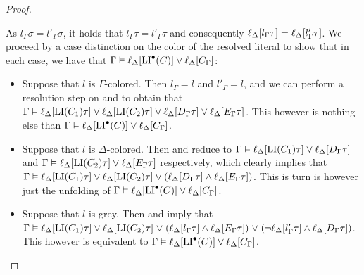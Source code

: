 \documentclass[,%
	draft=false,%
	numbers=noendperiod
	11pt,
	a4paper,
	oneside,%
	openany,
]{memoir}
\begin{document}
\begin{proof}
\begin{description}
			As $l_\Gamma\sigma = l'_\Gamma\sigma$,
			it holds that $l_\Gamma\tau = l'_\Gamma\tau$ and consequently 
			$\ell_{\Delta}[l_\Gamma\tau] = \ell_{\Delta}[l'_\Gamma\tau]$.
			We proceed by a case distinction on the color of the resolved literal to show that in each case, we have that
			$\Gamma \vDash \ell_{\Delta}[\operatorname{LI}^\bullet(C)] \lor \ell_{\Delta}[C_\Gamma]$:
			\begin{itemize}
				\item Suppose that $l$ is $\Gamma$-colored.
					Then $l_\Gamma = l$ and $l'_\Gamma = l$, and we can perform a resolution step on \markA{} and \markB{} to obtain that
					$\Gamma \vDash
					\ell_{\Delta}[\operatorname{LI}(C_1)\tau] \lor
					\ell_{\Delta}[\operatorname{LI}(C_2)\tau] \lor 
					\ell_{\Delta}[D_\Gamma\tau]  \lor
					\ell_{\Delta}[E_\Gamma\tau]$.
					This however is nothing else than $\Gamma \vDash \ell_{\Delta}[\operatorname{LI}^\bullet(C)] \lor \ell_{\Delta}[C_\Gamma]$.

				\item Suppose that $l$ is $\Delta$-colored.
					Then \markA{} and \markB{} reduce to 
					$\Gamma \vDash \ell_{\Delta}[\operatorname{LI}(C_1)\tau] \lor \ell_{\Delta}[D_\Gamma\tau]$
					and
					$\Gamma \vDash \ell_{\Delta}[\operatorname{LI}(C_2)\tau] \lor \ell_{\Delta}[E_\Gamma\tau]$
					respectively,
					which clearly implies that 
					$\Gamma \vDash \ell_{\Delta}[\operatorname{LI}(C_1)\tau] \lor \ell_{\Delta}[\operatorname{LI}(C_2)\tau] \lor (\ell_{\Delta}[D_\Gamma\tau] \land \ell_{\Delta}[E_\Gamma\tau])$.
					This is turn is however just the unfolding of
					$\Gamma \vDash \ell_{\Delta}[\operatorname{LI}^\bullet(C)] \lor \ell_{\Delta}[C_\Gamma]$.

				\item Suppose that $l$ is grey.
					Then \markA{} and \markB{} imply that
					$\Gamma \vDash
					\ell_{\Delta}[\operatorname{LI}(C_1)\tau] \lor
					\ell_{\Delta}[\operatorname{LI}(C_2)\tau] \;{\lor}\;\allowbreak
					(\ell_{\Delta}[l_\Gamma\tau] \land \ell_{\Delta}[E_\Gamma\tau]) \;{\lor}\;\allowbreak
					(\lnot\ell_{\Delta}[l'_\Gamma\tau] \land \ell_{\Delta}[D_\Gamma\tau])$.
					This however is equivalent to
					$\Gamma \vDash \ell_{\Delta}[\operatorname{LI}^\bullet(C)] \lor \ell_{\Delta}[C_\Gamma]$.

			\end{itemize}





\end{description}
\end{proof}
\end{document}
